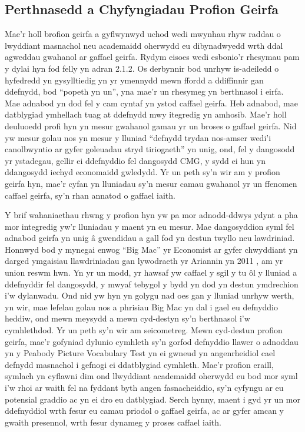 \subsection{Perthnasedd a Chyfyngiadau Profion Geirfa}
Mae’r holl brofion geirfa a gyflwynwyd uchod wedi mwynhau rhyw raddau o lwyddiant masnachol neu academaidd oherwydd eu dibynadwyedd wrth ddal agweddau gwahanol ar gaffael geirfa. Rydym eisoes wedi esbonio'r rhesymau pam y dylai hyn fod felly yn adran 2.1.2. Os derbynnir bod unrhyw is-adeiledd o hyfedredd yn gysylltiedig yn yr ymennydd mewn ffordd a ddiffinnir gan ddefnydd, bod ``popeth yn un'', yna mae'r un rhesymeg yn berthnasol i eirfa. Mae adnabod yn dod fel y cam cyntaf yn ystod caffael geirfa. Heb adnabod, mae datblygiad ymhellach tuag at ddefnydd mwy itegredig yn amhosib. Mae'r holl deuluoedd profi hyn yn mesur gwahanol gamau yr un broses o gaffael geirfa. Nid yw mesur golau nos yn mesur y lluniad ``defnydd trydan nos-amser wedi'i canolbwyntio ar gyfer goleuadau stryd tiriogaeth'' yn unig, ond, fel y dangosodd yr ystadegau, gellir ei ddefnyddio fel dangosydd CMG, y sydd ei hun yn ddangosydd iechyd economaidd gwledydd. Yr un peth sy'n wir am y profion geirfa hyn, mae'r cyfan yn lluniadau sy'n mesur camau gwahanol yr un ffenomen caffael geirfa, sy'n rhan annatod o gaffael iaith.

Y brif wahaniaethau rhwng y profion hyn yw pa mor adnodd-ddwys ydynt a pha mor integredig yw'r lluniadau y maent yn eu mesur. Mae dangosyddion syml fel adnabod geirfa yn unig â gwendidau a gall fod yn destun twyllo neu lawdriniad. Honnwyd bod y mynegai enwog ``Big Mac'' yr Economist ar gyfer chwyddiant yn darged ymgaisiau llawdriniadau gan lywodraeth yr Ariannin yn 2011 \parencite{politi_argentinas_2011}, am yr union reswm hwn. Yn yr un modd, yr hawsaf yw caffael y sgil y tu ôl y lluniad a ddefnyddir fel dangosydd, y mwyaf tebygol y bydd yn dod yn destun ymdrechion i'w dylanwadu. Ond nid yw hyn yn golygu nad oes gan y lluniad unrhyw werth, yn wir, mae lefelau golau nos a phrisiau Big Mac yn dal i gael eu defnyddio heddiw, ond mewn meysydd a mewn cyd-destyn sy'n berthnasol i'w cymhlethdod. Yr un peth sy'n wir am seicometreg. Mewn cyd-destun profion geirfa, mae’r gofyniad dylunio cymhleth sy’n gorfod defnyddio llawer o adnoddau yn y Peabody Picture Vocabulary Test yn ei gwneud yn angenrheidiol cael defnydd masnachol i gefnogi ei ddatblygiad cymhleth. Mae'r profion eraill, symlach yn cyflawni dim ond llwyddiant academaidd oherwydd eu bod mor syml i'w rhoi ar waith fel na fyddant byth angen fasnacheiddio, sy'n cyfyngu ar eu potensial graddio ac yn ei dro eu datblygiad. Serch hynny, maent i gyd yr un mor ddefnyddiol wrth fesur eu camau priodol o gaffael geirfa, ac ar gyfer amcan y gwaith presennol, wrth fesur dynameg y proses caffael iaith.

